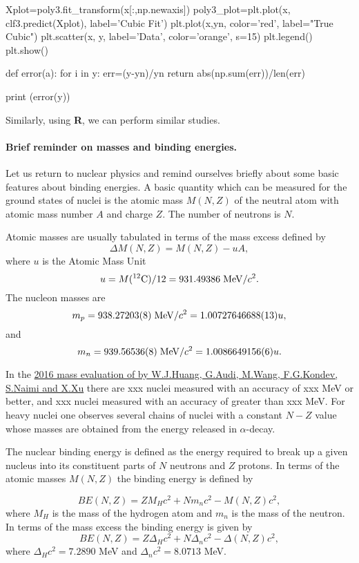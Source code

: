 \documentclass[%
oneside,                 %
final,                   %
10pt]{article}
\begin{document}
Xplot=poly3.fit_transform(x[:,np.newaxis])
poly3_plot=plt.plot(x, clf3.predict(Xplot), label='Cubic Fit')
plt.plot(x,yn, color='red', label="True Cubic")
plt.scatter(x, y, label='Data', color='orange', s=15)
plt.legend()
plt.show()

def error(a):
    for i in y:
        err=(y-yn)/yn
    return abs(np.sum(err))/len(err)

print (error(y))
\epycod

Similarly, using \textbf{R}, we can perform similar studies. 





\paragraph{Brief reminder on masses and binding energies.}
Let us return to nuclear physics and remind ourselves briefly about some basic features about binding
energies.  A basic quantity which can be measured for the ground
states of nuclei is the atomic mass $M(N, Z)$ of the neutral atom with
atomic mass number $A$ and charge $Z$. The number of neutrons is $N$.

Atomic masses are usually tabulated in terms of the mass excess defined by
\[
\Delta M(N, Z) =  M(N, Z) - uA,
\]
where $u$ is the Atomic Mass Unit 
\[
u = M(^{12}\mathrm{C})/12 = 931.49386 \hspace{0.1cm} \mathrm{MeV}/c^2.
\]
The nucleon masses are
\[
m_p = 938.27203(8)\hspace{0.1cm} \mathrm{MeV}/c^2 = 1.00727646688(13)u,
\] 
and
\[
m_n = 939.56536(8)\hspace{0.1cm} \mathrm{MeV}/c^2 = 1.0086649156(6)u.
\]

In the \href{{http://nuclearmasses.org/resources_folder/Wang_2017_Chinese_Phys_C_41_030003.pdf}}{2016 mass evaluation of by W.J.Huang, G.Audi, M.Wang, F.G.Kondev, S.Naimi and X.Xu}
there are xxx nuclei measured with an
accuracy of xxx MeV or better, and xxx nuclei measured with an
accuracy of greater than xxx MeV. For heavy nuclei one observes
several chains of nuclei with a constant $N-Z$ value whose masses are
obtained from the energy released in $\alpha$-decay.


The nuclear binding energy is defined as the energy required to break
up a given nucleus into its constituent parts of $N$ neutrons and $Z$
protons. In terms of the atomic masses $M(N, Z)$ the binding energy is
defined by


\[
BE(N, Z) = ZM_H c^2 + Nm_n c^2 - M(N, Z)c^2 ,
\]
where $M_H$ is the mass of the hydrogen atom and $m_n$ is the mass of the neutron.
In terms of the mass excess the binding energy is given by
\[
BE(N, Z) = Z\Delta_H c^2 + N\Delta_n c^2 -\Delta(N, Z)c^2 ,
\]
where $\Delta_H c^2 = 7.2890$ MeV and $\Delta_n c^2 = 8.0713$ MeV.
\end{document}
